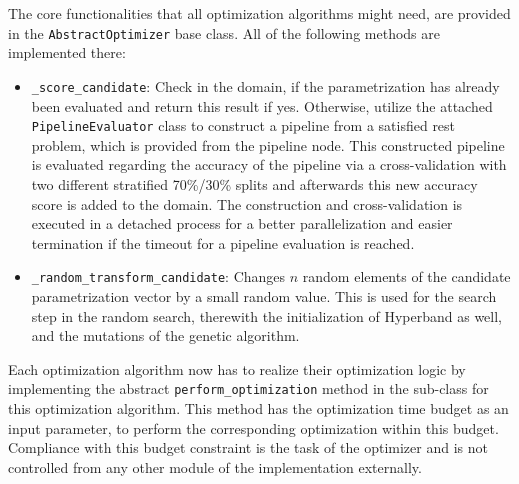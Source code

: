 The core functionalities that all optimization algorithms might need, are provided in the \texttt{AbstractOptimizer} base class.
All of the following methods are implemented there:
\begin{itemize}
    \item \texttt{\_score\_candidate}: Check in the domain, if the parametrization has already been evaluated and return this result if yes.
    Otherwise, utilize the attached \texttt{PipelineEvaluator} class to construct a pipeline from a satisfied rest problem, which is provided from the pipeline node.
    This constructed pipeline is evaluated regarding the accuracy of the pipeline via a cross-validation with two different stratified 70\%/30\% splits and afterwards this new accuracy score is added to the domain.
    The construction and cross-validation is executed in a detached process for a better parallelization and easier termination if the timeout for a pipeline evaluation is reached.
    \item \texttt{\_random\_transform\_candidate}: Changes $n$ random elements of the candidate parametrization vector by a small random value.
    This is used for the search step in the random search, therewith the initialization of Hyperband as well, and the mutations of the genetic algorithm.
\end{itemize}
Each optimization algorithm now has to realize their optimization logic by implementing the abstract \texttt{perform\_optimization} method in the sub-class for this optimization algorithm.
This method has the optimization time budget as an input parameter, to perform the corresponding optimization within this budget.
Compliance with this budget constraint is the task of the optimizer and is not controlled from any other module of the implementation externally.

